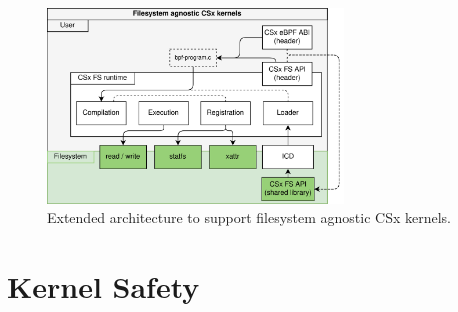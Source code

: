 

\begin{figure}
    \centering
	\includegraphics[width=0.7\textwidth]{resources/images/csx-fs-agnostic.png}
	\caption{Extended architecture to support filesystem agnostic CSx kernels.}
    \label{figure:csxfsruntime}
\end{figure}

\section{Kernel Safety}



